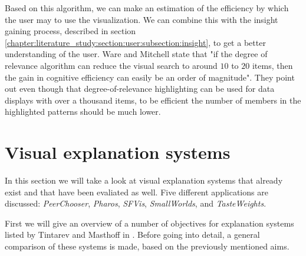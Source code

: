 Based on this algorithm, we can make an estimation of the efficiency by which the user may to use the visualization. We can combine this with the insight gaining process, described in section \ref{chapter:literature_study:section:user:subsection:insight}, to get a better understanding of the user. Ware and Mitchell state that "if the degree of relevance algorithm can reduce the visual search to around $10$ to $20$ items, then the gain in cognitive efficiency can easily be an order of magnitude"\cite{ware:2004}. They point out even though that degree-of-relevance highlighting can be used for data displays with over a thousand items, to be efficient the number of members in the highlighted patterns should be much lower\cite{ware:2004}.


































% 
\section{Visual explanation systems}\label{chapter:literature_study:section:applications}

In this section we will take a look at visual explanation systems that already exist and that have been evaliated as well. Five different applications are discussed: \emph{PeerChooser}, \emph{Pharos}, \emph{SFVis}, \emph{SmallWorlds}, and \emph{TasteWeights}.

First we will give an overview of a number of objectives for explanation systems listed by Tintarev and Masthoff in \cite{tintarev:2007:SER:1547550.1547664}. Before going into detail, a general comparison of these systems is made, based on the previously mentioned aims.


